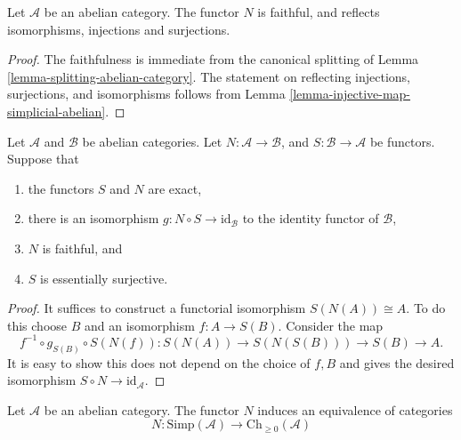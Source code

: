 \begin{lemma}
\label{lemma-N-faithful}
Let $\mathcal{A}$ be an abelian category.
The functor $N$ is faithful, and reflects
isomorphisms, injections and surjections.
\end{lemma}

\begin{proof}
The faithfulness is immediate from the canonical
splitting of Lemma \ref{lemma-splitting-abelian-category}.
The statement on reflecting injections, surjections, and
isomorphisms follows from
Lemma \ref{lemma-injective-map-simplicial-abelian}.
\end{proof}

\begin{lemma}
\label{lemma-S-N}
Let $\mathcal{A}$ and $\mathcal{B}$ be abelian categories.
Let $N : \mathcal{A} \to \mathcal{B}$, and
$S : \mathcal{B} \to \mathcal{A}$ be functors.
Suppose that
\begin{enumerate}
\item the functors $S$ and $N$ are exact,
\item there is an isomorphism $g : N \circ S \to \text{id}_\mathcal{B}$
to the identity functor of $\mathcal{B}$,
\item $N$ is faithful, and
\item $S$ is essentially surjective.
\end{enumerate}
\end{lemma}

\begin{proof}
It suffices to construct a functorial
isomorphism $S(N(A)) \cong A$. To do this
choose $B$ and an isomorphism $f : A  \to S(B)$.
Consider the map
$$
f^{-1} \circ g_{S(B)} \circ S(N(f)) :
S(N(A)) \to S(N(S(B))) \to S(B) \to A.
$$
It is easy to show this does not depend on
the choice of $f, B$ and gives the desired
isomorphism $S \circ N \to \text{id}_\mathcal{A}$.
\end{proof}

\begin{theorem}
\label{theorem-dold-kan}
Let $\mathcal{A}$ be an abelian category.
The functor $N$ induces an equivalence of
categories
$$
N :
\text{Simp}(\mathcal{A})
\longrightarrow
\text{Ch}_{\geq 0}(\mathcal{A})
$$
\end{theorem}

